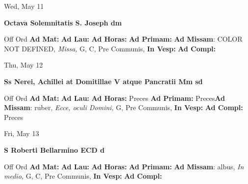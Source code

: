 \documentclass[10pt]{memoir}
\begin{document}
\begin{center}
\begin{minipage}{3.5in}
\vspace{2em}
\begin{center}Wed, May 11
\end{center}
\textbf{ \large Octava Solemnitatis S. Joseph
\textnormal{\normalsize dm}}

\begin{justify}Off Ord
\textbf{Ad Mat: }
\textbf{Ad Lau: }
\textbf{Ad Horas: }
\textbf{Ad Primam: }\textbf{Ad Missam}: COLOR NOT DEFINED, \textit{Missa,} G, C, Pre Communis, 
\textbf{In Vesp: }
\textbf{Ad Compl: }
\end{justify}
\end{minipage}
\end{center}

\begin{center}
\begin{minipage}{3.5in}
\vspace{2em}
\begin{center}Thu, May 12
\end{center}
\textbf{ \large Ss Nerei, Achillei at Domitillae V atque Pancratii Mm
\textnormal{\normalsize sd}}

\begin{justify}Off Ord
\textbf{Ad Mat: }
\textbf{Ad Lau: }
\textbf{Ad Horas: }Preces
\textbf{Ad Primam: }Preces\textbf{Ad Missam}: ruber, \textit{Ecce, oculi Domini,} G, Pre Communis, 
\textbf{In Vesp: }
\textbf{Ad Compl: }Preces
\end{justify}
\end{minipage}
\end{center}

\begin{center}
\begin{minipage}{3.5in}
\vspace{2em}
\begin{center}Fri, May 13
\end{center}
\textbf{ \large S Roberti Bellarmino ECD
\textnormal{\normalsize d}}

\begin{justify}Off Ord
\textbf{Ad Mat: }
\textbf{Ad Lau: }
\textbf{Ad Horas: }
\textbf{Ad Primam: }\textbf{Ad Missam}: albus, \textit{In medio,} G, C, Pre Communis, 
\textbf{In Vesp: }
\textbf{Ad Compl: }
\end{justify}
\end{minipage}
\end{center}
\end{document}
